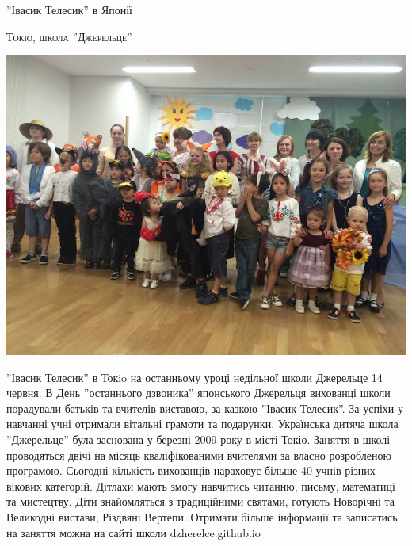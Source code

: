 \documentclass[10pt,a4paper]{article}
\newcommand{\NewsItem}[1]{%
		\usefont{T2A}{iwona}{m}{n} 
		\large #1 \vspace{4pt}
		\par \normalsize \normalfont}
\newcommand{\NewsAuthor}[1]{%
			\hfill \textsc{#1} \vspace{4pt}
			\par \normalfont}
\begin{document}
\begin{multicols}{3}
\vspace{1cm}
\NewsItem{''Івасик Телесик'' в Японії}
\NewsAuthor{Токіо, школа ''Джерельце''}
		\begin{center}
			\includegraphics[width=0.8\linewidth]{images/telesyk}
		\end{center}
''Івасик Телесик'' в Токio на останньому уроці недільної школи Джерельце 14 червня. В День ''останнього дзвоника'' японського Джерельця вихованці школи порадували батьків та вчителів виставою, за казкою ''Івасик Телесик''. За успіхи у навчанні учні отримали вітальні грамоти та подарунки. Українська дитяча школа ''Джерельце'' була заснована у березні 2009 року в місті Токіо. Заняття в школі проводяться двічі на місяць кваліфікованими вчителями за власно розробленою програмою. Сьогодні кількість вихованців нараховує більше 40 учнів різних вікових категорій. Дітлахи мають змогу навчитись читанню, письму, математиці та мистецтву. Діти знайомляться з традиційними святами, готують Новорічні та Великодні вистави, Різдвяні Вертепи. Отримати більше інформації та записатись на заняття можна на сайті школи dzherelce.github.io 


\end{multicols}
\end{document}
